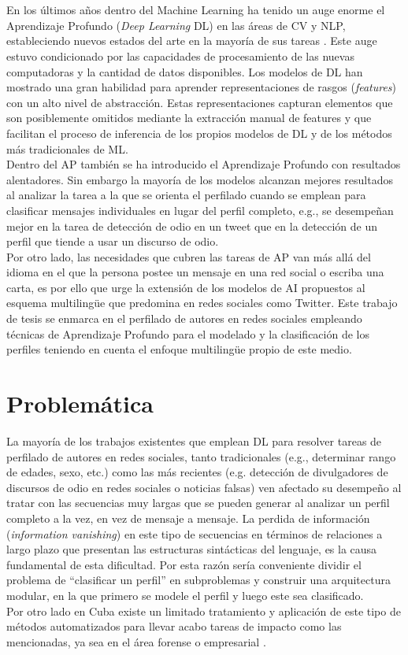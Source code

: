 \\
\\
En los últimos años dentro del Machine Learning ha tenido un auge enorme el Aprendizaje Profundo (\textit{Deep Learning} DL) en las áreas de CV y NLP, estableciendo nuevos estados del arte en la mayoría de sus tareas \citep{electronics8030292}. Este auge estuvo condicionado por las capacidades de procesamiento de las nuevas computadoras y la cantidad de datos disponibles. Los modelos de DL han mostrado una gran habilidad para aprender representaciones de rasgos (\textit{features}) con un alto nivel de abstracción. Estas representaciones capturan elementos que son posiblemente omitidos mediante la extracción manual de features y que facilitan el proceso de inferencia de los propios modelos de DL y de los métodos más tradicionales de ML. 
\\
Dentro del AP también se ha introducido el Aprendizaje Profundo con resultados alentadores. Sin embargo la mayoría de los modelos alcanzan mejores resultados al analizar la tarea a la que se orienta el perfilado cuando se emplean para clasificar mensajes individuales en lugar del perfil completo, e.g., se desempeñan mejor en la tarea de detección de odio en un tweet que en la detección de un perfil que tiende a usar un discurso de odio. 
\\
Por otro lado, las necesidades que cubren las tareas de AP van más allá del idioma en el que la persona postee un mensaje en una red social o escriba una carta, es por ello que urge la extensión de los modelos de AI propuestos al esquema multilingüe que predomina en redes sociales como Twitter. Este trabajo de tesis se enmarca en el perfilado de autores en redes sociales empleando técnicas de Aprendizaje Profundo para el modelado y la clasificación de los perfiles teniendo en cuenta el enfoque multilingüe propio de este medio. 

\section*{Problemática}
La mayoría de los trabajos existentes que emplean DL para resolver tareas de perfilado de autores en redes sociales, tanto tradicionales (e.g., determinar rango de edades, sexo, etc.) como las más recientes (e.g. detección de divulgadores de discursos de odio en redes sociales o noticias falsas) ven afectado su desempeño al tratar con las secuencias muy largas que se pueden generar al analizar un perfil completo a la vez, en vez de mensaje a mensaje. La perdida de información (\textit{information vanishing}) en este tipo de secuencias en términos de relaciones a largo plazo que presentan las estructuras sintácticas del lenguaje, es la causa fundamental de esta dificultad. Por esta razón sería conveniente dividir el problema de ``clasificar un perfil'' en subproblemas y construir una arquitectura modular, en la que primero se modele el perfil y luego este sea clasificado.
\\
Por otro lado en Cuba existe un limitado tratamiento y aplicación de este tipo de métodos automatizados para llevar acabo tareas de impacto como las mencionadas, ya sea en el área forense o empresarial .

